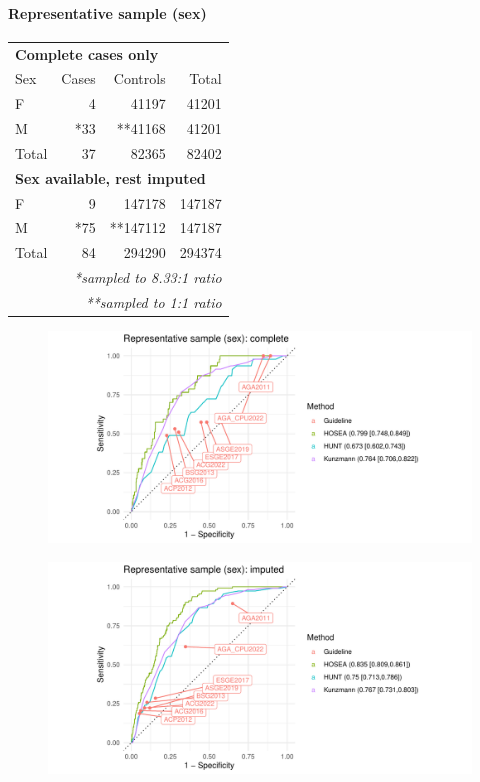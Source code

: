 \documentclass[12pt]{article}
\begin{document}
\paragraph*{Representative sample (sex)}

\begin{table}[h]
\centering
\begin{tabular}{lrrr}
\toprule
\multicolumn{4}{l}{\textbf{Complete cases only}} \\
Sex & Cases & Controls & Total \\
\midrule
F & 4 & 41197 & 41201 \\
M & *33 & **41168 & 41201 \\
Total & 37 & 82365 & 82402 \\
 \midrule
\multicolumn{4}{l}{\textbf{Sex available, rest imputed}} \\
\midrule
F & 9 & 147178 & 147187 \\
M & *75 & **147112 & 147187 \\
Total & 84 & 294290 & 294374 \\
 \bottomrule
 \multicolumn{4}{r}{\textit{*sampled to 8.33:1 ratio}}\\
 \multicolumn{4}{r}{\textit{**sampled to 1:1 ratio}}
\end{tabular}
\end{table}

\begin{figure}[h]
\centering
\includegraphics[width=\textwidth]{figures/comparison_sex_complete.pdf}
\end{figure}

\begin{figure}[h]
\centering
\includegraphics[width=\textwidth]{figures/comparison_sex_imputed.pdf}
\end{figure}
  
\end{document}
